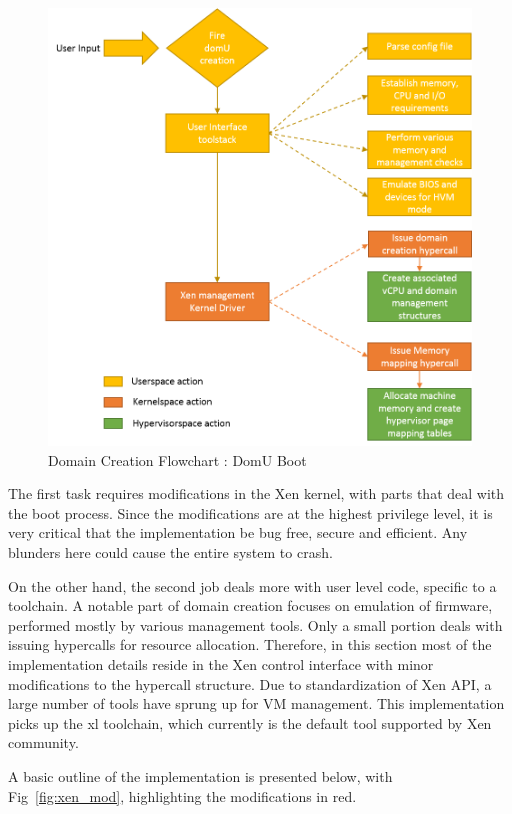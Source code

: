 \begin{figure}[H]
\centering
\includegraphics[scale=0.9]{figures/domain_creation2.png}
\caption{Domain Creation Flowchart : DomU Boot}
\label{fig:dom_flowchart}
\end{figure}
The first task requires modifications in the Xen kernel, with parts that deal with the boot process. Since the modifications are at the highest privilege level, it is very critical that the implementation be bug free, secure and efficient. Any blunders here could cause the entire system to crash.

On the other hand, the second job deals more with user level code, specific to a toolchain. A notable part of domain creation focuses on emulation of firmware, performed mostly by various management tools. Only a small portion deals with issuing hypercalls for resource allocation. Therefore, in this section most of the implementation details reside in the Xen control interface with minor modifications to the hypercall structure. Due to standardization of Xen API, a large number of tools have sprung up for VM management. This implementation picks up the xl toolchain, which currently is the default tool supported by Xen community.

A basic outline of the implementation is presented below, with Fig~\ref{fig:xen_mod}, highlighting the modifications in red.

